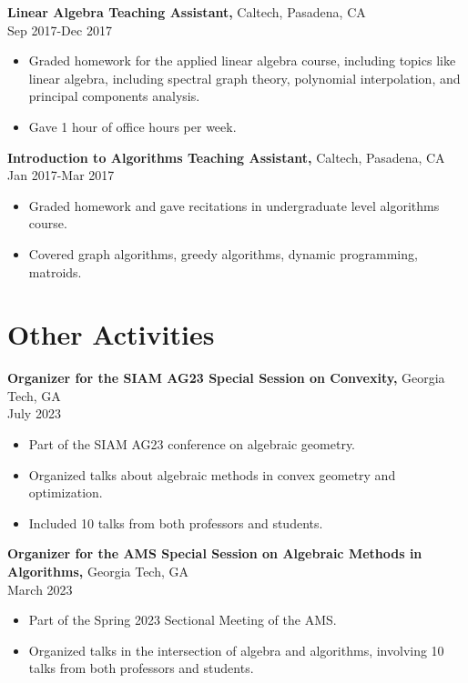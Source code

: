 \documentclass[margin]{res}
\begin{document}
\begin{resume}
{\bf Linear Algebra Teaching Assistant,} Caltech, Pasadena, CA \\ Sep 2017-Dec 2017
\begin{itemize} \itemsep -2pt %
\item Graded homework for the applied linear algebra course, including topics like linear algebra, including spectral graph theory, polynomial
interpolation, and principal components analysis.
\item Gave 1 hour of office hours per week.
\end{itemize}
 
{\bf Introduction to Algorithms Teaching Assistant,} Caltech, Pasadena, CA \\ Jan 2017-Mar 2017
\begin{itemize} \itemsep -2pt %
\item Graded homework and gave recitations in undergraduate level algorithms course.
\item Covered graph algorithms, greedy algorithms, dynamic programming, matroids.
\end{itemize}

\section{Other   Activities} 
       {\bf Organizer for the SIAM AG23 Special Session on Convexity,} Georgia Tech, GA    \\       July 2023
        \begin{itemize} \itemsep -2pt
          \item Part of the SIAM AG23 conference on algebraic geometry.
          \item Organized talks about algebraic methods in convex geometry and optimization.
          \item Included 10 talks from both professors and students.
		 \end{itemize}

       {\bf Organizer for the AMS Special Session on Algebraic Methods in Algorithms,} Georgia Tech, GA    \\       March 2023
        \begin{itemize} \itemsep -2pt
          \item Part of the Spring 2023 Sectional Meeting of the AMS.
          \item Organized talks in the intersection of algebra and algorithms, involving 10 talks from both professors and students.
		 \end{itemize}


\end{resume}
\end{document}
